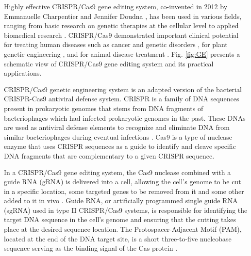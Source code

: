 \documentclass[unnumsec,webpdf,contemporary,large]{oup-authoring-template}
\theoremstyle{thmstyleone}%
\theoremstyle{thmstyletwo}%
\theoremstyle{thmstylethree}%
\begin{document}

Highly effective CRISPR/Cas9 gene editing system, co-invented in 2012 by Emmanuelle Charpentier and Jennifer Doudna \citep{jinek2012programmable}, has been used in various fields, ranging from basic research on genetic therapies at the cellular level to applied biomedical research \citep{jinek2012programmable, cho2013targeted, cong2013multiplex, mali2013cas9, chang2013genome, hsu2014development}. CRISPR/Cas9 demonstrated important clinical potential for treating human diseases such as cancer and genetic disorders \citep{kang2017addressing, liang2015crispr, ma2017correction}, for plant genetic engineering  \citep{liu2017crispr, tang2016single, raitskin2016multi}, and for animal disease treatment \cite{zarei2019creating, wang2013eradication}. Fig. \ref{fig:GE} presents a schematic view of CRISPR/Cas9 gene editing system and its practical applications.

CRISPR/Cas9 genetic engineering system is an adapted version of the bacterial CRISPR-Cas9 antiviral defense system. CRISPR is a family of DNA sequences present in prokaryotic genomes that stems from DNA fragments of bacteriophages which had infected prokaryotic genomes in the past. These DNAs are used as antiviral defense elements to recognize and eliminate DNA from similar bacteriophages during eventual infections \citep{barrangou2007crispr}. Cas9 is a type of nuclease enzyme that uses CRISPR sequences as a guide to identify and cleave specific DNA fragments that are complementary to a given CRISPR sequence.

 In a CRISPR/Cas9 gene editing system, the Cas9 nuclease combined with a guide RNA (gRNA) is delivered into a cell, allowing the cell's genome to be cut in a specific location, some targeted genes to be removed from it and some other added to it in vivo \cite{bak2018gene}. Guide RNA, or artificially programmed single guide RNA (sgRNA) used in type II CRISPR/Cas9 systems, is responsible for identifying the target DNA sequence in the cell's genome and ensuring that the cutting takes place at the desired sequence location. The Protospacer-Adjacent Motif (PAM), located at the end of the DNA target site, is a short three-to-five nucleobase sequence serving as the binding signal of the Cas protein \cite{shah2013protospacer}.
\end{document}
